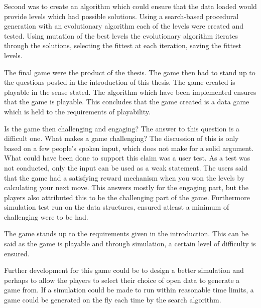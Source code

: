 \documentclass[a4paper,11pt]{article}
\begin{document}
Second was to create an algorithm which could ensure that the data loaded would provide levels which had possible solutions. Using a search-based procedural generation with an evolutionary algorithm each of the levels were created and tested. Using mutation of the best levels the evolutionary algorithm iterates through the solutions, selecting the fittest at each iteration, saving the fittest levels. 

The final game were the product of the thesis. The game then had to stand up to the questions posted in the introduction of this thesis. The game created is playable in the sense stated. The algorithm which have been implemented ensures that the game is playable. This concludes that the game created is a data game which is held to the requirements of playability. 

Is the game then challenging and engaging? The answer to this question is a difficult one. What makes a game challenging? The discussion of this is only based on a few people's spoken input, which does not make for a solid argument. What could have been done to support this claim was a user test. As a test was not conducted, only the input can be used as a weak statement. The users said that the game had a satisfying reward mechanism when you won the levels by calculating your next move. This answers mostly for the engaging part, but the players also attributed this to be the challenging part of the game. Furthermore simulation test run on the data structures, ensured atleast a minimum of challenging were to be had.

The game stands up to the requirements given in the introduction. This can be said as the game is playable and through simulation, a certain level of difficulty is ensured. 

Further development for this game could be to design a better simulation and perhaps to allow the players to select their choice of open data to generate a game from. If a simulation could be made to run within reasonable time limits, a game could be generated on the fly each time by the search algorithm.

\pagebreak
{}


\pagebreak
\end{document}
